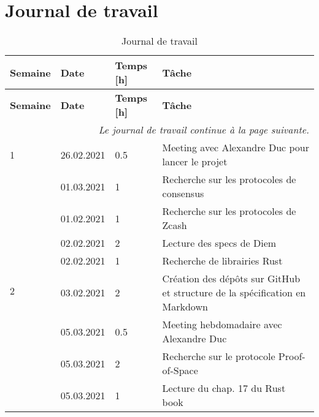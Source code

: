 \chapter{Journal de travail}

\bgroup
\def\arraystretch{1.5}
\begin{longtable}[c]{l l l p{8.2cm}}
    \caption{Journal de travail}\\

    \hline
    \textbf{Semaine} & \textbf{Date} & \textbf{Temps [h]} & \textbf{Tâche}\\
    \hline
    \hline
    \endfirsthead
    
    \hline
    \textbf{Semaine} & \textbf{Date} & \textbf{Temps [h]} & \textbf{Tâche}\\
    \hline
    \hline
    \endhead
    
    \multicolumn{4}{r}{\small \it Le journal de travail continue à la page suivante.} \\
    \normalsize
    \endfoot
    
    \hline
    \endlastfoot
	
	1
	& 26.02.2021
	& 0.5
	& Meeting avec Alexandre Duc pour lancer le projet \\
	
	\hline
	
	\multirow{8}{*}{2}
	& 01.03.2021
	& 1
	& Recherche sur les protocoles de consensus \\
	
	& 01.02.2021
	& 1
	& Recherche sur les protocoles de Zcash \\
	
	& 02.02.2021
	& 2
	& Lecture des specs de Diem \\
	
	& 02.02.2021
	& 1
	& Recherche de librairies Rust \\
	
	& 03.02.2021
	& 2
	& Création des dépôts sur GitHub et structure de la spécification en Markdown \\
	
	& 05.03.2021
	& 0.5
	& Meeting hebdomadaire avec Alexandre Duc \\
	
	& 05.03.2021
	& 2
	& Recherche sur le protocole Proof-of-Space \\
	
	& 05.03.2021
	& 1
	& Lecture du chap. 17 du Rust book \\
	
	\hline
	

\end{longtable}
